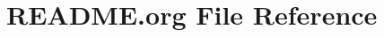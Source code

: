 \hypertarget{_r_e_a_d_m_e_8org}{}\section{R\+E\+A\+D\+M\+E.\+org File Reference}
\label{_r_e_a_d_m_e_8org}

